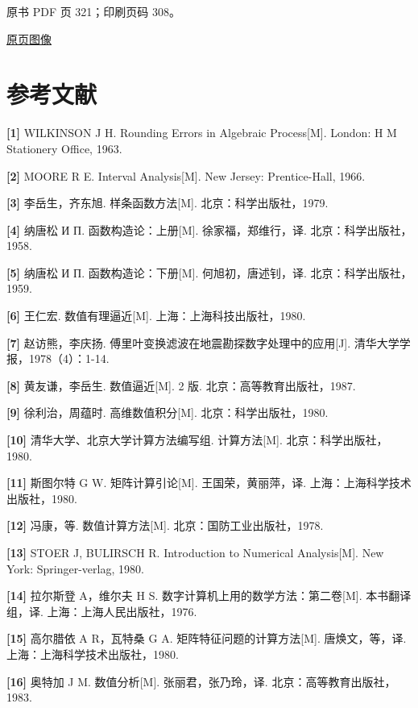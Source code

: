 \clearpage

原书 PDF 页 321；印刷页码 308。

\href{source-images/pdf-321.jpeg}{原页图像}

\section{参考文献}\label{back-ux53c2ux8003ux6587ux732e}

\textbf{{[}1{]}} WILKINSON J H. Rounding Errors in Algebraic Process{[}M{]}. London: H M Stationery Office, 1963.

\textbf{{[}2{]}} MOORE R E. Interval Analysis{[}M{]}. New Jersey: Prentice-Hall, 1966.

\textbf{{[}3{]}} 李岳生，齐东旭. 样条函数方法{[}M{]}. 北京：科学出版社，1979.

\textbf{{[}4{]}} 纳唐松 И П. 函数构造论：上册{[}M{]}. 徐家福，郑维行，译. 北京：科学出版社，1958.

\textbf{{[}5{]}} 纳唐松 И П. 函数构造论：下册{[}M{]}. 何旭初，唐述钊，译. 北京：科学出版社，1959.

\textbf{{[}6{]}} 王仁宏. 数值有理逼近{[}M{]}. 上海：上海科技出版社，1980.

\textbf{{[}7{]}} 赵访熊，李庆扬. 傅里叶变换滤波在地震勘探数字处理中的应用{[}J{]}. 清华大学学报，1978（4）：1-14.

\textbf{{[}8{]}} 黄友谦，李岳生. 数值逼近{[}M{]}. 2 版. 北京：高等教育出版社，1987.

\textbf{{[}9{]}} 徐利治，周蕴时. 高维数值积分{[}M{]}. 北京：科学出版社，1980.

\textbf{{[}10{]}} 清华大学、北京大学计算方法编写组. 计算方法{[}M{]}. 北京：科学出版社，1980.

\textbf{{[}11{]}} 斯图尔特 G W. 矩阵计算引论{[}M{]}. 王国荣，黄丽萍，译. 上海：上海科学技术出版社，1980.

\textbf{{[}12{]}} 冯康，等. 数值计算方法{[}M{]}. 北京：国防工业出版社，1978.

\textbf{{[}13{]}} STOER J, BULIRSCH R. Introduction to Numerical Analysis{[}M{]}. New York: Springer-verlag, 1980.

\textbf{{[}14{]}} 拉尔斯登 A，维尔夫 H S. 数字计算机上用的数学方法：第二卷{[}M{]}. 本书翻译组，译. 上海：上海人民出版社，1976.

\textbf{{[}15{]}} 高尔腊依 A R，瓦特桑 G A. 矩阵特征问题的计算方法{[}M{]}. 唐焕文，等，译. 上海：上海科学技术出版社，1980.

\textbf{{[}16{]}} 奥特加 J M. 数值分析{[}M{]}. 张丽君，张乃玲，译. 北京：高等教育出版社，1983.

